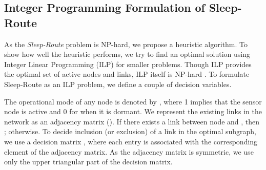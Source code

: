 \documentclass[conference]{IEEEtran}
\begin{document}
\subsection{Integer Programming Formulation of Sleep-Route}
As the \emph{Sleep-Route} problem is NP-hard, we propose a heuristic algorithm. To show how well the heuristic performs, we try to find an optimal solution using Integer Linear Programming (ILP) for smaller problems. Though ILP provides the optimal set of active nodes and links, ILP itself is NP-hard \cite{karp1972reducibility}. To formulate Sleep-Route as an ILP problem, we define a couple of decision variables. 

The operational mode of any node  is denoted by , where 1 implies that the sensor node  is active and 0 for when it is dormant. We represent the existing links in the network as an adjacency matrix (). If there exists a link between node  and , then ;  otherwise. To decide inclusion (or exclusion) of a link in the optimal subgraph, we use a decision matrix , where each entry is associated with the corresponding element of the adjacency matrix. As the adjacency matrix is symmetric, we use only the upper triangular part of the decision matrix.
\end{document}

